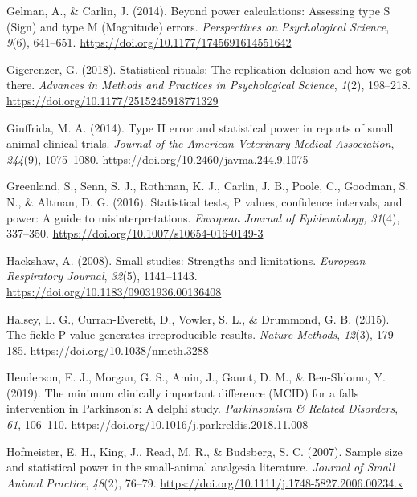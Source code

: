 \documentclass[authordate, meta, issue]{jote-new-article}
\begin{document}
	Gelman, A., \& Carlin, J. (2014). Beyond power calculations: Assessing type S (Sign) and type M (Magnitude) errors. \emph{Perspectives on Psychological Science}, \emph{9}(6), 641--651. \url{https://doi.org/10.1177/1745691614551642}



	Gigerenzer, G. (2018). Statistical rituals: The replication delusion and how we got there. \emph{Advances in Methods and Practices in Psychological Science}, \emph{1}(2), 198--218. \url{https://doi.org/10.1177/2515245918771329}



	Giuffrida, M. A. (2014). Type II error and statistical power in reports of small animal clinical trials. \emph{Journal of the American Veterinary Medical Association}, \emph{244}(9), 1075--1080. \url{https://doi.org/10.2460/javma.244.9.1075}



	Greenland, S., Senn, S. J., Rothman, K. J., Carlin, J. B., Poole, C., Goodman, S. N., \& Altman, D. G. (2016). Statistical tests, P values, confidence intervals, and power: A guide to misinterpretations. \emph{European Journal of Epidemiology,} \emph{31}(4), 337--350. \url{https://doi.org/10.1007/s10654-016-0149-3}



	Hackshaw, A. (2008). Small studies: Strengths and limitations. \emph{European Respiratory Journal}, \emph{32}(5), 1141--1143. \url{https://doi.org/10.1183/09031936.00136408}



	Halsey, L. G., Curran-Everett, D., Vowler, S. L., \& Drummond, G. B. (2015). The fickle P value generates irreproducible results. \emph{Nature Methods}, \emph{12}(3), 179--185. \url{https://doi.org/10.1038/nmeth.3288}



	Henderson, E. J., Morgan, G. S., Amin, J., Gaunt, D. M., \& Ben-Shlomo, Y. (2019). The minimum clinically important difference (MCID) for a falls intervention in Parkinson's: A delphi study. \emph{Parkinsonism \& Related Disorders}, \emph{61}, 106--110. \url{https://doi.org/10.1016/j.parkreldis.2018.11.008}



	Hofmeister, E. H., King, J., Read, M. R., \& Budsberg, S. C. (2007). Sample size and statistical power in the small-animal analgesia literature. \emph{Journal of Small Animal Practice}, \emph{48}(2), 76--79. \url{https://doi.org/10.1111/j.1748-5827.2006.00234.x}
\end{document}
